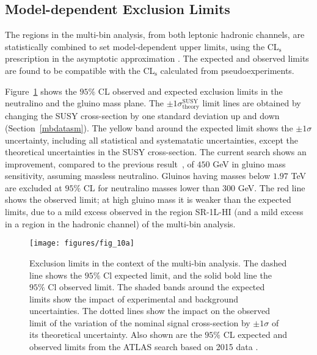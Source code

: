 \subsection{Model-dependent Exclusion Limits}\label{mb:mdel}

The regions in the multi-bin analysis, from both leptonic hadronic channels,
are statistically combined to set model-dependent upper limits, using the
CL$_{\text{s}}$ prescription in the asymptotic approximation
\cite{Cowan:2010js}. The expected and observed limits are found to be
compatible with the CL$_{\text{s}}$ calculated from pseudoexperiments.

Figure~\ref{f:fig_10a} shows the $95\%$ CL observed and expected exclusion
limits in the neutralino and the gluino mass plane. The $\pm 1
	\sigma^{\text{SUSY}}_{\text{theory}}$ limit lines are obtained by changing the
SUSY cross-section by one standard deviation up and down
(Section~\ref{mbdatasm}). The yellow band around the expected limit shows the
$\pm 1\sigma$ uncertainty, including all statistical and systematatic
uncertainties, except the theoretical uncertainties in the SUSY cross-section.
The current search shows an improvement, compared to the previous
result~\cite{Aad:2016eki}, of $450$ GeV in gluino mass sensitivity, assuming
massless neutralino. Gluinos having masses below $1.97$ TeV are excluded at
$95\%$ CL for neutralino masses lower than $300$ GeV. The red line shows the
observed limit; at high gluino mass it is weaker than the expected limits, due
to a mild excess observed in the region SR-1L-HI (and a mild excess in a region
in the hadronic channel) of the multi-bin analysis.


\begin{figure}[H]
	\texttt{[image: figures/fig\_10a]}
	\centering

	\caption{Exclusion limits in the context of the multi-bin analysis. The dashed line shows
		the $95\%$ Cl expected limit, and the solid bold line the $95\%$ Cl observed limit. The shaded
		bands around the expected limits show the impact of experimental and background uncertainties.
		The dotted lines show the impact on the observed limit of the variation of the nominal signal
		cross-section by $\pm 1 \sigma$ of its theoretical uncertainty. Also shown are the
		$95\%$ CL expected and observed limits from the ATLAS search based on 2015 data \cite{Aad:2016eki}.}

	\label{f:fig_10a}
\end{figure}



